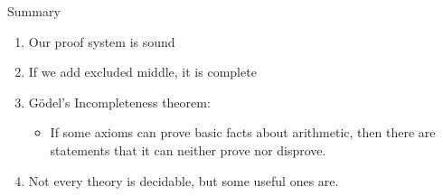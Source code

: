 \documentclass[xetex,aspectratio=169,14pt,hyperref={pdfpagelabels=true,pdflang={en-GB}}]{beamer}
\begin{document}
\begin{frame}
  {Summary}

  \begin{enumerate}
  \item Our proof system is sound
  \item If we add excluded middle, it is complete
  \item G{\"o}del's Incompleteness theorem:
    \begin{itemize}
    \item If some axioms can prove basic facts about arithmetic, then
      there are statements that it can neither prove nor disprove.
    \end{itemize}
  \item Not every theory is decidable, but some useful ones are.
  \end{enumerate}
\end{frame}










\end{document}

